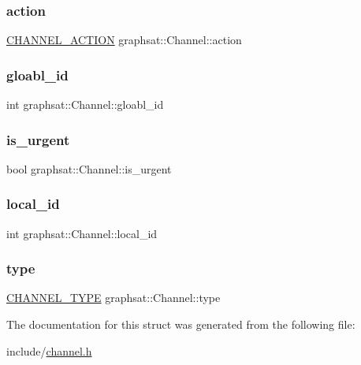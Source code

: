 \subsubsection{\texorpdfstring{action}{action}}
{\footnotesize\ttfamily \mbox{\hyperlink{namespacegraphsat_a67a431baf7f0e88f25c885fbf855531c}{C\+H\+A\+N\+N\+E\+L\+\_\+\+A\+C\+T\+I\+ON}} graphsat\+::\+Channel\+::action}

\mbox{\label{structgraphsat_1_1_channel_a9f9c88b4f0aaea8878c39f740dacad7e}} 
\subsubsection{\texorpdfstring{gloabl\_id}{gloabl\_id}}
{\footnotesize\ttfamily int graphsat\+::\+Channel\+::gloabl\+\_\+id}

\mbox{\label{structgraphsat_1_1_channel_a732172762c3bfe8b06d9fca5f9449f99}} 
\subsubsection{\texorpdfstring{is\_urgent}{is\_urgent}}
{\footnotesize\ttfamily bool graphsat\+::\+Channel\+::is\+\_\+urgent}

\mbox{\label{structgraphsat_1_1_channel_a3852c6ef7fdc21e5873caac1b34b3493}} 
\subsubsection{\texorpdfstring{local\_id}{local\_id}}
{\footnotesize\ttfamily int graphsat\+::\+Channel\+::local\+\_\+id}

\mbox{\label{structgraphsat_1_1_channel_aae966aacfb4c1809b86571d6edc85931}} 
\subsubsection{\texorpdfstring{type}{type}}
{\footnotesize\ttfamily \mbox{\hyperlink{namespacegraphsat_a0c6d85311290cc56a9ca1b39edcf6a75}{C\+H\+A\+N\+N\+E\+L\+\_\+\+T\+Y\+PE}} graphsat\+::\+Channel\+::type}



The documentation for this struct was generated from the following file\+:\begin{DoxyCompactItemize}
\item 
include/\mbox{\hyperlink{channel_8h}{channel.\+h}}\end{DoxyCompactItemize}
